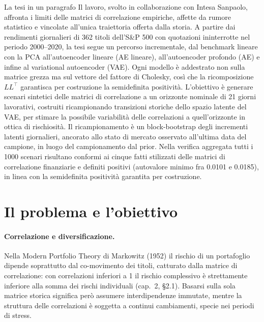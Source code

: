 \begin{riquadro}{La tesi in un paragrafo}
Il lavoro, svolto in collaborazione con Intesa Sanpaolo, affronta i limiti delle matrici di correlazione empiriche, affette da rumore statistico e vincolate all'unica traiettoria offerta dalla storia. A partire dai rendimenti giornalieri di 362 titoli dell'S\&P 500 con quotazioni ininterrotte nel periodo 2000--2020, la tesi segue un percorso incrementale, dal benchmark lineare con la PCA all'autoencoder lineare (AE lineare), all'autoencoder profondo (AE) e infine al variational autoencoder (VAE). Ogni modello è addestrato non sulla matrice grezza ma sul vettore del fattore di Cholesky, così che la ricomposizione $L L^{\top}$ garantisca per costruzione la semidefinita positività. L'obiettivo è generare scenari sintetici delle matrici di correlazione a un orizzonte nominale di 21 giorni lavorativi, costruiti ricampionando transizioni storiche dello spazio latente del VAE, per stimare la possibile variabilità delle correlazioni a quell'orizzonte in ottica di rischiosità. Il ricampionamento è un block-bootstrap degli incrementi latenti giornalieri, ancorato allo stato di mercato osservato all'ultima data del campione, in luogo del campionamento dal prior. Nella verifica aggregata tutti i 1000 scenari risultano conformi ai cinque fatti stilizzati delle matrici di correlazione finanziarie e definiti positivi (autovalore minimo fra 0.0101 e 0.0185), in linea con la semidefinita positività garantita per costruzione.
\end{riquadro}

\section{Il problema e l'obiettivo}

\paragraph{Correlazione e diversificazione.} Nella Modern Portfolio Theory di Markowitz (1952) il rischio di un portafoglio dipende soprattutto dal co-movimento dei titoli, catturato dalla matrice di correlazione: con correlazioni inferiori a 1 il rischio complessivo è strettamente inferiore alla somma dei rischi individuali (cap.~2, \S2.1). Basarsi sulla sola matrice storica significa però assumere interdipendenze immutate, mentre la struttura delle correlazioni è soggetta a continui cambiamenti, specie nei periodi di stress.

